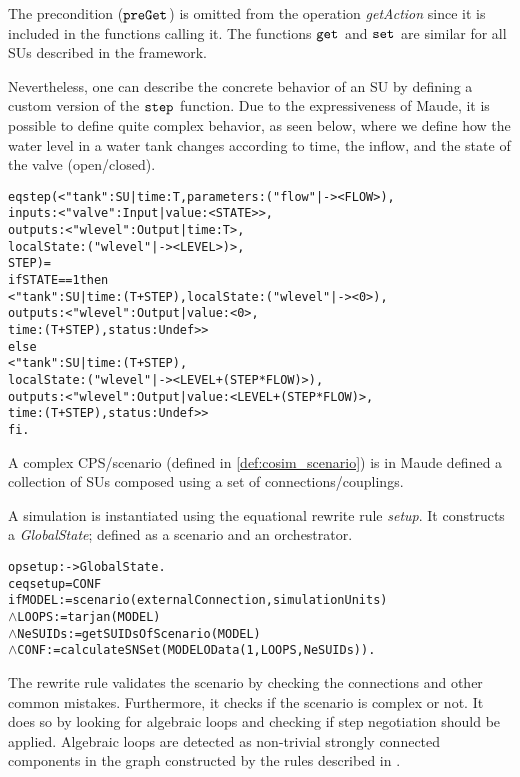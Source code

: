 The precondition ($\mathtt{preGet}_{}$) is omitted from the operation \emph{getAction} since it is included in the functions calling it.
The functions $\mathtt{get}_{}$ and $\mathtt{set}_{}$ are similar for all SUs described in the framework.

Nevertheless, one can describe the concrete behavior of an SU by defining a custom version of the $\mathtt{step}_{}$ function.
Due to the expressiveness of Maude, it is possible to define quite complex behavior, as seen below, where we define how the water level in a water tank changes according to time, the inflow, and the state of the valve (open/closed).
\begin{alltt}
  \small
  eq step(< "tank" : SU | time : T, parameters : ("flow" |-> < FLOW >), 
                      inputs : < "valve" : Input | value : < STATE > >, 
                      outputs : < "wlevel" : Output | time : T >,
                      localState : ( "wlevel" |-> < LEVEL > ) >,
                      STEP) = 
  if STATE == 1 then 
      < "tank" : SU | time:(T+STEP), localState : ( "wlevel" |-> < 0 > ),
      outputs : < "wlevel" : Output | value : < 0 >, 
      time : (T + STEP), status : Undef > >
    else 
      < "tank" : SU | time : (T + STEP), 
      localState : ( "wlevel" |-> < LEVEL + (STEP * FLOW) > ), 
      outputs :< "wlevel" : Output|value : < LEVEL + (STEP * FLOW) >, 
      time : (T + STEP), status : Undef > > 
  fi .
\end{alltt}

A complex CPS/scenario (defined in \cref{def:cosim_scenario}) is in Maude defined a collection of SUs composed using a set of connections/couplings.

A simulation is instantiated using the equational rewrite rule \emph{setup}.
It constructs a \emph{GlobalState}; defined as a scenario and an orchestrator.

\begin{alltt}
  \small
  op setup : -> GlobalState .
  ceq setup = { CONF }
    if MODEL := scenario(externalConnection, simulationUnits)
    \(\land\) LOOPS := tarjan(MODEL)
    \(\land\) NeSUIDs := getSUIDsOfScenario(MODEL)
    \(\land\) CONF := calculateSNSet(MODEL OData(1,LOOPS, NeSUIDs)) .
\end{alltt}

The rewrite rule validates the scenario by checking the connections and other common mistakes.
Furthermore, it checks if the scenario is complex or not.
It does so by looking for algebraic loops and checking if step negotiation should be applied.
Algebraic loops are detected as non-trivial strongly connected components in the graph constructed by the rules described in \cite{Gomes2019c}. 

